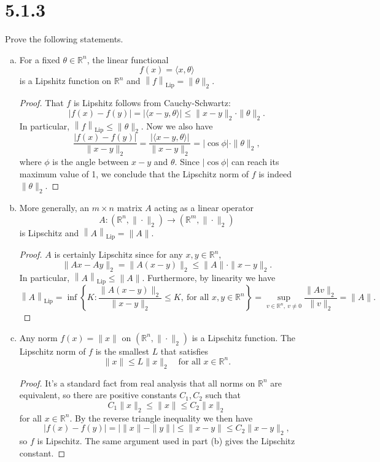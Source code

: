 \documentclass[11pt,letterpaper]{report}
\newcommand{\reals}{\mathbb{R}}
\newcommand{\Lip}[1]{\left\|{#1}\right\|_{\text{Lip}}}
\begin{document}
\section*{5.1.3}
Prove the following statements.
\begin{enumerate}[(a)]
	\item For a fixed $\theta\in \reals^n$, the linear functional
	\[
	f(x)= \langle x, \theta\rangle
	\]
	is a Lipshitz function on $\reals^n$ and $\Lip{f} = \|\theta\|_2$.
	\begin{proof}
		That $f$ is Lipshitz follows from Cauchy-Schwartz:
		\[
		|f(x)-f(y)| = |\langle x-y, \theta\rangle| \leq \|x-y\|_2 \cdot \|\theta\|_2.
		\]
		In particular, $\Lip{f}\leq \|\theta\|_2$. Now we also have
		\[
		\frac{|f(x)-f(y)|}{\|x-y\|_2} = \frac{|\langle x-y, \theta\rangle|}{\|x-y\|_2} = |\cos \phi|\cdot \|\theta\|_2,
		\]
		where $\phi$ is the angle between $x-y$ and $\theta$. Since $|\cos \phi|$ can reach its maximum value of 1, we conclude that the Lipschitz norm of $f$ is indeed $\|\theta\|_2$.
	\end{proof}

	\item More generally, an $m\times n$ matrix $A$ acting as a linear operator
	\[
	A: (\reals^n, \|\cdot \|_2)\to (\reals^m, \|\cdot \|_2)
	\]
	is Lipschitz and $\Lip{A} = \|A\|$.
	\begin{proof}
		$A$ is certainly Lipschitz since for any $x,y\in \reals^n$,
		\[
		\|Ax - Ay\|_2 = \|A(x-y)\|_2 \leq \|A\|\cdot \|x-y\|_2.
		\]
		In particular, $\Lip{A}\leq \|A\|$. Furthermore, by linearity we have
		\[
		\Lip{A} = \inf\left\{K: \frac{\|A(x-y)\|_2}{\|x-y\|_2}\leq K,\ \text{for all }x,y\in \reals^n\right\} = \sup_{v\in \reals^n,\ v\neq 0}\frac{\|Av\|_2}{\|v\|_2} = \|A\|.
		\]
	\end{proof}

	\item Any norm $f(x) = \|x\|$ on $(\reals^n, \|\cdot\|_2)$ is a Lipschitz function. The Lipschitz norm of $f$ is the smallest $L$ that satisfies
	\[
	\|x\|\leq L\|x\|_2\quad\text{for all }x\in \reals^n.
	\]
	\begin{proof}
		It's a standard fact from real analysis that all norms on $\reals^n$ are equivalent, so there are positive constants $C_1, C_2$ such that
		\[
		C_1\|x\|_2 \leq \|x\| \leq C_2\|x\|_2
		\]
		for all $x\in \reals^n$. By the reverse triangle inequality we then have
		\[
		|f(x)-f(y)|= \big|\|x\|-\|y\|\big| \leq \|x-y\| \leq C_2\|x-y\|_2,
		\]
		so $f$ is Lipschitz. The same argument used in part (b) gives the Lipschitz constant.
	\end{proof}
\end{enumerate}
\end{document}
